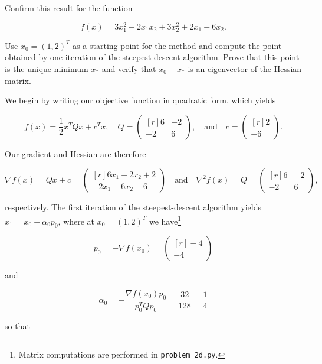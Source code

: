 Confirm this result for the function 

$$
f(x) = 3 x_1^2 - 2 x_1 x_2 + 3 x_2^2 + 2 x_1 - 6 x_2.
$$

Use $x_0 = (1, 2)^T$ as a starting point for the method and compute the point obtained by one iteration of the 
steepest-descent algorithm. Prove that this point is the unique minimum $x_*$ and verify that $x_0 - x_*$ is an
eigenvector of the Hessian matrix.

\begin{solution}
    We begin by writing our objective function in quadratic form, which yields

    $$
    f(x) = \frac{1}{2} x^T Q x + c^T x, \quad Q = \begin{pmatrix*}[r]
        6 & -2 \\
       -2 &  6
    \end{pmatrix*}, \quad \text{and} \quad c = \begin{pmatrix*}[r]
        2 \\
       -6
    \end{pmatrix*}.
    $$

    Our gradient and Hessian are therefore

    $$
    \nabla f(x) = Q x + c = \begin{pmatrix*}[r]
        6 x_1 - 2 x_2 + 2 \\
       -2 x_1 + 6 x_2 - 6
    \end{pmatrix*} \quad \text{and} \quad \nabla^2 f(x) = Q = \begin{pmatrix*}[r]
        6 & -2 \\
       -2 &  6
    \end{pmatrix*},
    $$

    respectively. The first iteration of the steepest-descent algorithm yields \linebreak
    $x_1 = x_0 + \alpha_0 p_0$, where at $x_0 = (1, 2)^T$ we have\footnote{
        Matrix computations are performed in \texttt{problem\_2d.py}.
    }

    $$
    p_0 = -\nabla f(x_0) = \begin{pmatrix*}[r]
        -4 \\
        -4
    \end{pmatrix*}
    $$

    and 

    $$
    \alpha_0 = -\frac{\nabla f(x_0) p_0}{p_0^T Q p_0} = \frac{32}{128} = \frac{1}{4}
    $$

    so that


\end{solution}
